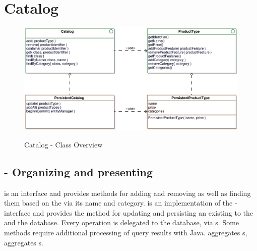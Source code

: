 \newpage
\section{Catalog}

\begin{figure}[ht]
	\centering
  \includegraphics[width=1.0\textwidth]{images/Catalog_Overview.eps}
	\label{catalog_overview}
	\caption{Catalog - Class Overview}
\end{figure}

\subsection{ - Organizing and presenting }
 is an interface and provides methods for adding and removing  as well as finding them based on the  via its name and category.
 is an implementation of the -interface and provides the  method for updating and persisting an existing  to the  and the database. 
Every operation is delegated to the database, via s. Some methods require additional processing of query results with Java.
 aggregates s,  aggregates s.






